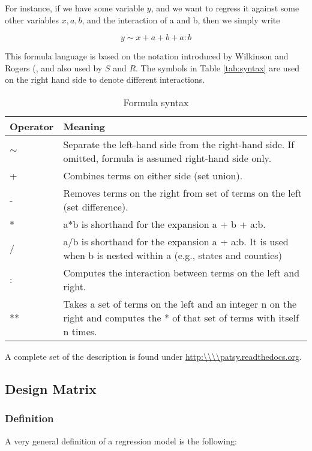 For instance, if we have some variable $y$, and we want to regress it against some other variables $x, a, b$, and the interaction of a and b, then we simply write

\begin{equation}
    y \sim x + a + b + a:b
\end{equation}

This formula language is based on the notation introduced by Wilkinson and Rogers (\cite{Wilkinson1973}, and also used by $S$ and $R$.
The symbols in Table \ref{tab:syntax} are used on the right hand side to denote different interactions.

\begin{table}
  \centering
  \footnotesize{
  \begin{tabular}{ p{2cm} p{9cm} }
     Operator & Meaning \\
     \hline
    $\sim $ &	Separate the left-hand side from the right-hand side. If omitted, formula is assumed right-hand side only. \\
    + &	Combines terms on either side (set union). \\
    - &	Removes terms on the right from set of terms on the left (set difference). \\
    * &	a*b is shorthand for the expansion a + b + a:b. \\
    / &	a/b is shorthand for the expansion a + a:b. It is used when b is nested within a (e.g., states and counties) \\
    : &	Computes the interaction between terms on the left and right. \\
    ** & Takes a set of terms on the left and an integer n on the right and computes the * of that set of terms with itself n times.\\
     \hline
  \end{tabular}
  }
  \caption{Formula syntax}
\end{table}\label{tab:syntax}

A complete set of the description is found under \url{http:\\\\patsy.readthedocs.org}.

\subsection{Design Matrix}

\subsubsection{Definition}
A very general definition of a regression model is the following:

